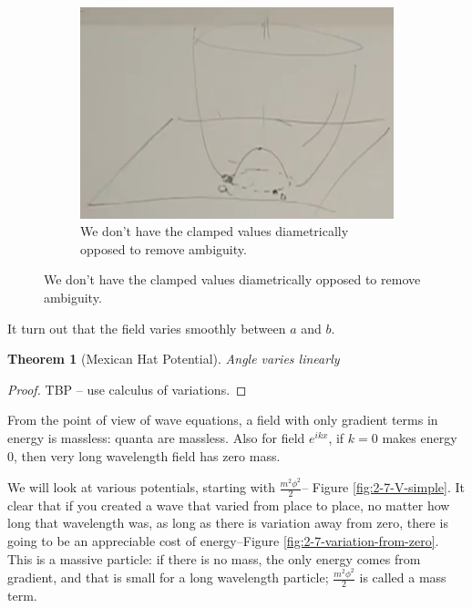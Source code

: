 \documentclass[]{article}
\newtheorem{thm}{Theorem}
\begin{document}
\begin{figure}[H]
\begin{subfigure}[t]{0.45\textwidth}
	\end{subfigure}
	\hfill
	\begin{subfigure}[t]{0.45\textwidth}
		\caption{We don't have the clamped values diametrically opposed to remove ambiguity.}\label{fig:2-7-V-quartic-domain-wall}
		\includegraphics[width=\textwidth]{2-7-V-quartic-domain-wall}
	\end{subfigure}
\end{figure}

It turn out that the field varies smoothly between $a$ and $b$.

\begin{thm}[Mexican Hat Potential]
	Angle varies linearly
\end{thm}
\begin{proof}
	TBP -- use calculus of variations.
\end{proof}

 From the point of view of wave equations, a field with only gradient terms in energy is massless: quanta are massless. Also for field $e^{ikx}$, if $k=0$ makes energy $0$, then very long wavelength field has zero mass.
 
We will look at various potentials, starting with $\frac{m^2 \phi^2}{2}$--  Figure \ref{fig:2-7-V-simple}. It clear that if you created a wave that varied from place to place, no matter how long that wavelength was, as long as there is  variation away from zero, there is going to be an appreciable cost of energy--Figure \ref{fig:2-7-variation-from-zero}. This is a massive particle: if there is no mass, the only energy comes from gradient, and that is small for a long wavelength particle; $\frac{m^2 \phi^2}{2}$ is called a mass term.
\end{document}
